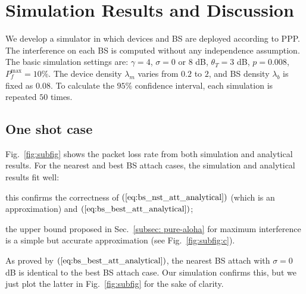 \section{Simulation Results and Discussion}
\label{sec:simulation}
\begin{figure*}
	\hspace{-2.3em}
	\hspace{-2.1em}
	\caption{Network packet loss rate with respect to normalized load $p\lambda_{m}/\lambda_{b}$ (ANA=analytical, SIM=simulation)}
	\label{fig:subfig} %
	\vspace{-2em}
\end{figure*}
We develop a simulator in which devices and BS are deployed according to PPP. The interference on each BS is computed without any independence assumption. The basic simulation settings are: $\gamma=4$, $\sigma = 0$ or $8$ dB, $\theta_{T} =3$ dB, $p=0.008$, $P_{f}^{\text{max}}=10\%$. The device density $\lambda_m$ varies from $0.2$ to $2$, and BS density $\lambda_{b}$ is fixed as $0.08$. To calculate the $95\%$ confidence interval, each simulation is repeated $50$ times. 
\subsection{One shot case}
Fig.~\ref{fig:subfig} shows the packet loss rate from both simulation and analytical results. For the nearest and best BS attach cases, the simulation and analytical results fit well:\begin{inparaenum}[i)]
	\item this confirms the correctness of $(\ref{eq:bs_nst_att_analytical})$ (which is an approximation) and $(\ref{eq:bs_best_att_analytical})$;
	\item the upper bound proposed in Sec.~\ref{subsec: pure-aloha} for maximum interference is a simple but accurate approximation (see Fig.~\ref{fig:subfig:c}).
\end{inparaenum} 
As proved by $(\ref{eq:bs_best_att_analytical})$, the nearest BS attach with $\sigma=0$ dB is identical to the best BS attach case. Our simulation confirms this, but we just plot the latter in Fig.~\ref{fig:subfig} for the sake of clarity. 


